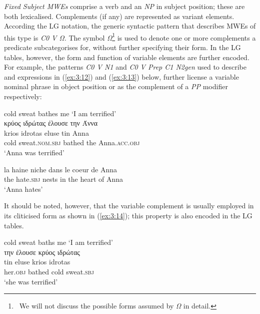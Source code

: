 \documentclass[output=paper]{langsci/langscibook}
\begin{document}
\textit{Fixed Subject MWEs} comprise a verb and an \textit{NP
}in subject position; these are both lexicalised. Complements (if any)
are represented as variant elements. According the LG notation, the
generic syntactic pattern that describes MWEs of this type is
\textit{C0 V Ω.} The symbol \textit{Ω}\footnote{\ We will
not discuss  the possible forms assumed by
\textit{Ω} in detail.} is used to denote one or more complements a
predicate subcategorises for, without further specifying their form. In
the LG tables, however, the form and function of variable elements are
further encoded. For example, the patterns \textit{C0 V N1} and
\textit{C0 V Prep C1 N2gen} used to describe  and  expressions in
(\ref{ex:3:12}) and (\ref{ex:3:13}) below, further license a variable nominal phrase in
object position or as the complement of a \textit{PP} modifier
respectively:

\begin{exe}
\ex \label{ex:3:12}
cold sweat bathes me `I am terrified' \\
\glll κρύος ιδρώτας έλουσε την Άννα \\
krios idrotas eluse tin Anna\\
cold sweat.\textsc{nom.sbj}  bathed the Anna.\textsc{acc.obj}\\
\glt %
‘Anna was terrified’
\end{exe}

\begin{exe}
\ex \label{ex:3:13}
\gll  la haine niche dans le coeur de Anna \\
the hate.\textsc{sbj} nests in the heart of Anna\\
\glt ‘Anna hates’
\end{exe}

It should be noted, however, that the variable complement is usually
employed in its cliticised form as shown in (\ref{ex:3:14}); this property is also
encoded in the LG tables. 

\begin{exe}
\ex \label{ex:3:14}
cold sweat baths me `I am terrified'\\
\glll  την έλουσε κρύος ιδρώτας \\
 tin eluse krios idrotas\\
her.\textsc{obj} bathed cold sweat.\textsc{sbj}\\
\glt %
‘she was terrified’
\end{exe}
\end{document}
